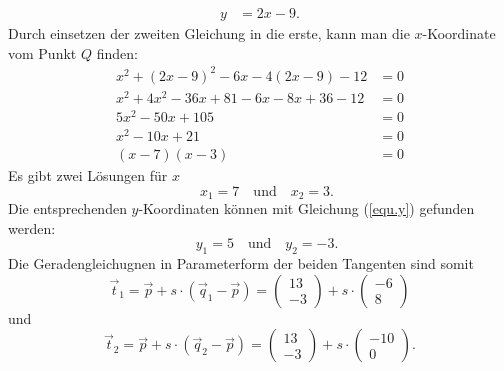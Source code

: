 \begin{loesung}
\begin{align}
  y &= 2x-9.
  \label{equ.y}
\end{align}
Durch einsetzen der zweiten Gleichung in die erste, 
kann man die $x$-Koordinate vom Punkt $Q$ finden:
\begin{align*}
  x^2 + (2x-9)^2 -6x -4(2x-9) - 12 &= 0\\
  x^2 + 4x^2 - 36x + 81 -6x -8x + 36 - 12 &= 0\\
  5x^2 - 50x + 105 &= 0\\
  x^2 - 10x + 21 &= 0\\
  (x-7)(x-3) &= 0
\end{align*}
Es gibt zwei Lösungen für $x$
\[
  \quad x_1 = 7 \quad\text{und}\quad  x_2 = 3.
\]
Die entsprechenden $y$-Koordinaten können mit Gleichung (\ref{equ.y})
gefunden werden:
\[
  \quad y_1 = 5 \quad\text{und}\quad  y_2 = -3.
\]
Die Geradengleichugnen in Parameterform der beiden Tangenten sind somit
\[
\vec t_1 = \vec p + s\cdot (\vec q_{1} -\vec p ) 
= \begin{pmatrix}13\\-3\end{pmatrix} + s\cdot \begin{pmatrix}-6\\8\end{pmatrix}
\]
und
\[
\vec t_2 = \vec p + s\cdot (\vec q_{2} - \vec p ) 
= \begin{pmatrix}13\\-3\end{pmatrix} + s\cdot \begin{pmatrix}-10\\0\end{pmatrix}.
\]
\end{loesung}
